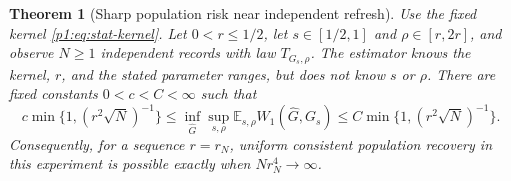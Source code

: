 \documentclass[11pt,a4paper]{article}
\newtheorem{theorem}{Theorem}[section]
\theoremstyle{definition}
\theoremstyle{remark}
\numberwithin{equation}{section}
\begin{document}
\begin{theorem}[Sharp population risk near independent refresh]
\label{p1:thm:stat-minimax}
Use the fixed kernel \eqref{p1:eq:stat-kernel}.  Let $0<r\le1/2$, let
$s\in[1/2,1]$ and $\rho\in[r,2r]$, and observe $N\ge1$ independent records
with law $T_{G_s,\rho}$.  The estimator knows the kernel, $r$, and the stated
parameter ranges, but does not know $s$ or $\rho$.  There are fixed constants
$0<c<C<\infty$ such that
\begin{equation}\label{p1:eq:stat-minimax}
 c\min\{1,(r^2\sqrt N)^{-1}\}
 \le \inf_{\widehat G}\sup_{s,\rho}
       \mathbb E_{s,\rho}W_1(\widehat G,G_s)
 \le C\min\{1,(r^2\sqrt N)^{-1}\}.
\end{equation}
Consequently, for a sequence $r=r_N$, uniform consistent population recovery
in this experiment is possible exactly when $Nr_N^4\to\infty$.
\end{theorem}
\end{document}
